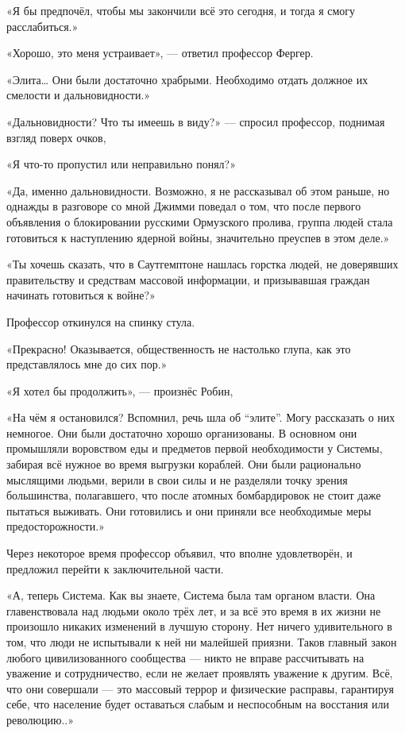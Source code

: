 \documentclass[a5paper, 9pt,
final, openany, twoside=true]{memoir}
\begin{document}
«Я бы предпочёл, чтобы мы закончили всё это сегодня, и тогда я смогу расслабиться.»

«Хорошо, это меня устраивает», — ответил профессор Фергер.

«Элита… Они были достаточно храбрыми. Необходимо отдать должное их смелости и дальновидности.»

«Дальновидности? Что ты имеешь в виду?» — спросил профессор, поднимая взгляд поверх очков,

«Я что-то пропустил или неправильно понял?»

«Да, именно дальновидности. Возможно, я не рассказывал об этом раньше, но однажды в разговоре со мной Джимми поведал о том, что после первого объявления о блокировании русскими Ормузского пролива, группа людей стала готовиться к наступлению ядерной войны, значительно преуспев в этом деле.»

«Ты хочешь сказать, что в Саутгемптоне нашлась горстка людей, не доверявших правительству и средствам массовой информации, и призывавшая граждан начинать готовиться к войне?»

Профессор откинулся на спинку стула.

«Прекрасно! Оказывается, общественность не настолько глупа, как это представлялось мне до сих пор.»

«Я хотел бы продолжить», — произнёс Робин,

«На чём я остановился? Вспомнил, речь шла об ``элите''. Могу рассказать о них немногое. Они были достаточно хорошо организованы. В основном они промышляли воровством еды и предметов первой необходимости у Системы, забирая всё нужное во время выгрузки кораблей. Они были рационально мыслящими людьми, верили в свои силы и не разделяли точку зрения большинства, полагавшего, что после атомных бомбардировок не стоит даже пытаться выживать. Они готовились и они приняли все необходимые меры предосторожности.»\bigskip

Через некоторое время профессор объявил, что вполне удовлетворён, и предложил перейти к заключительной части.

«А, теперь Система. Как вы знаете, Система была там органом власти. Она главенствовала над людьми около трёх лет, и за всё это время в их жизни не произошло никаких изменений в лучшую сторону. Нет ничего удивительного в том, что люди не испытывали к ней ни малейшей приязни. Таков главный закон любого цивилизованного сообщества — никто не вправе рассчитывать на уважение и сотрудничество, если не желает проявлять уважение к другим. Всё, что они совершали — это массовый террор и физические расправы, гарантируя себе, что население будет оставаться слабым и неспособным на восстания или революцию..»\bigskip
\end{document}
